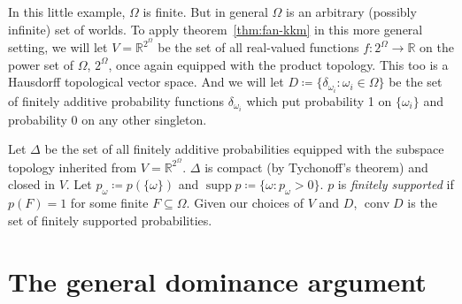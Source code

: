 \documentclass[11pt]{article}
\theoremstyle{definition}
\newtheorem{definition}[theorem]{Definition}
\theoremstyle{remark}
\newcommand{\supp}{\operatorname{supp}}
\begin{document}
In this little example, $\Omega$ is finite. But in general $\Omega$ is an arbitrary (possibly infinite) set of worlds. To apply theorem~\ref{thm:fan-kkm} in this more general setting, we will let $V=\mathbb R^{2^\Omega}$ be the set of all real-valued functions $f:2^\Omega\rightarrow\mathbb R$ on the power set of $\Omega$, $2^\Omega$, once again equipped with the product topology. This too is a Hausdorff topological vector space. And we will let $D\coloneqq\{\delta_{\omega_i}:\omega_i\in\Omega\}$ be the set of finitely additive probability functions $\delta_{\omega_i}$ which put probability 1 on $\{\omega_i\}$ and probability 0 on any other singleton. 

Let $\Delta$ be the set of all finitely additive probabilities equipped with the subspace topology inherited from $V=\mathbb R^{2^\Omega}$. $\Delta$ is compact (by Tychonoff's theorem) and closed in $V$. Let $p_\omega\coloneqq p(\{\omega\})$ and $\supp p\coloneqq\{\omega:p_\omega>0\}$.  $p$ is \emph{finitely supported} if $p(F)=1$ for some finite $F\subseteq\Omega$. Given our choices of $V$ and $D$, $\operatorname{conv}D$ is the set of finitely supported probabilities.








\section{The general dominance argument}\label{sec:gen-dom}
\end{document}
